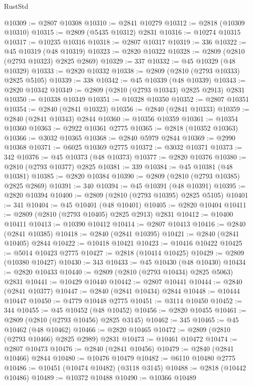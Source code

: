 \begin{lexlean}{RustStd}
\begin{coremodule}
@10309 := @2807 @10308
@10310 := @2841 @10279
@10312 := @2818 (@10309 @10310)
@10315 := @2809 (@5435 @10312) @2831
@10316 := @10274 @10315
@10317 := @10235 @10316
@10318 := @2807 @10317
@10319 := 336
@10322 := @45 @10319 (@48 @10319)
@10323 := @2820 @10322
@10328 := @2809 (@2810 (@2793 @10323) @2825 @2869)
@10329 := 337
@10332 := @45 @10329 (@48 @10329)
@10333 := @2820 @10332
@10338 := @2809 (@2810 (@2793 @10333) @2825 @5105)
@10339 := 338
@10342 := @45 @10339 (@48 @10339)
@10343 := @2820 @10342
@10349 := @2809 (@2810 (@2793 @10343) @2825 @2913) @2831
@10350 := @10338 @10349
@10351 := @10328 @10350
@10352 := @2807 @10351
@10354 := @2840 (@2841 @10323)
@10356 := @2840 (@2841 @10333)
@10359 := @2840 (@2841 @10343) @2844
@10360 := @10356 @10359
@10361 := @10354 @10360
@10363 := @2922 @10361 @2775
@10365 := @2818 (@10352 @10363)
@10366 := @3032 @10365
@10368 := @2840 @5979 @2844
@10369 := @2990 @10368
@10371 := @6025 @10369 @2775
@10372 := @3032 @10371
@10373 := 342
@10376 := @45 @10373 (@48 @10373)
@10377 := @2820 @10376
@10380 := @2810 (@2793 @10377) @2825
@10381 := 339
@10384 := @45 @10381 (@48 @10381)
@10385 := @2820 @10384
@10390 := @2809 (@2810 (@2793 @10385) @2825 @2869)
@10391 := 340
@10394 := @45 @10391 (@48 @10391)
@10395 := @2820 @10394
@10400 := @2809 (@2810 (@2793 @10395) @2825 @5105)
@10401 := 341
@10404 := @45 @10401 (@48 @10401)
@10405 := @2820 @10404
@10411 := @2809 (@2810 (@2793 @10405) @2825 @2913) @2831
@10412 := @10400 @10411
@10413 := @10390 @10412
@10414 := @2807 @10413
@10416 := @2840 (@2841 @10385)
@10418 := @2840 (@2841 @10395)
@10421 := @2840 (@2841 @10405) @2844
@10422 := @10418 @10421
@10423 := @10416 @10422
@10425 := @5014 @10423 @2775
@10427 := @2818 (@10414 @10425)
@10429 := @2809 (@10380 @10427)
@10430 := 343
@10433 := @45 @10430 (@48 @10430)
@10434 := @2820 @10433
@10440 := @2809 (@2810 (@2793 @10434) @2825 @5063) @2831
@10441 := @10429 @10440
@10442 := @2807 @10441
@10444 := @2840 (@2841 @10377)
@10447 := @2840 (@2841 @10434) @2844
@10448 := @10444 @10447
@10450 := @4779 @10448 @2775
@10451 := @3114 @10450
@10452 := 344
@10455 := @45 @10452 (@48 @10452)
@10456 := @2820 @10455
@10461 := @2809 (@2810 (@2793 @10456) @2825 @3145)
@10462 := 345
@10465 := @45 @10462 (@48 @10462)
@10466 := @2820 @10465
@10472 := @2809 (@2810 (@2793 @10466) @2825 @2989) @2831
@10473 := @10461 @10472
@10474 := @2807 @10473
@10476 := @2840 (@2841 @10456)
@10479 := @2840 (@2841 @10466) @2844
@10480 := @10476 @10479
@10482 := @6110 @10480 @2775
@10486 := @10451 (@10474 @10482) (@3118 @3145)
@10488 := @2818 (@10442 @10486)
@10489 := @10372 @10488
@10490 := @10366 @10489

\end{coremodule}
\end{lexlean}
